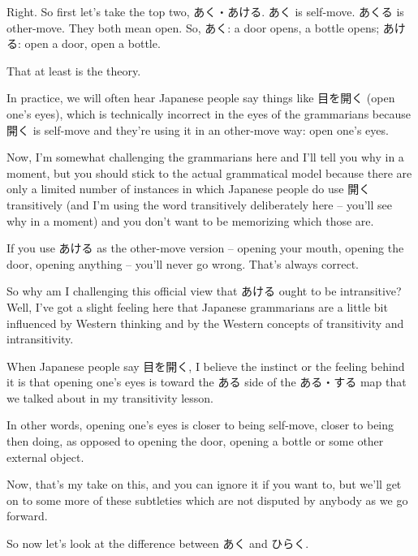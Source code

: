 Right. So first let's take the top two, あく・あける. あく is self-move. あくる is other-move. They both mean open. So, あく: a door opens, a bottle opens; あける: open a door, open a bottle.

That at least is the theory.

{}

In practice, we will often hear Japanese people say things like 目を開く (open one's eyes), which is technically incorrect in the eyes of the grammarians because 開く is self-move and they're using it in an other-move way: open one's eyes.

Now, I'm somewhat challenging the grammarians here and I'll tell you why in a moment, but you should stick to the actual grammatical model because there are only a limited number of instances in which Japanese people do use 開く transitively (and I'm using the word transitively deliberately here -- you'll see why in a moment) and you don't want to be memorizing which those are.

If you use あける as the other-move version -- opening your mouth, opening the door, opening anything -- you'll never go wrong. That's always correct.

So why am I challenging this official view that あける ought to be intransitive? Well, I've got a slight feeling here that Japanese grammarians are a little bit influenced by Western thinking and by the Western concepts of transitivity and intransitivity.

When Japanese people say 目を開く, I believe the instinct or the feeling behind it is that opening one's eyes is toward the ある side of the ある・する map that we talked about in my transitivity lesson.

{}

In other words, opening one's eyes is closer to being self-move, closer to being then doing, as opposed to opening the door, opening a bottle or some other external object.

Now, that's my take on this, and you can ignore it if you want to, but we'll get on to some more of these subtleties which are not disputed by anybody as we go forward.

\startsectionlevel[title={開く (ひらく & あく)},reference={開く-ひらく-あく}]

So now let's look at the difference between あく and ひらく.

{}

